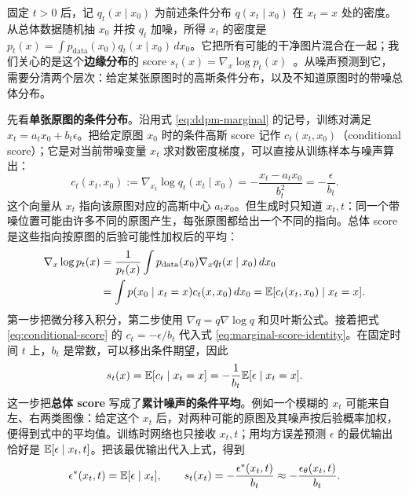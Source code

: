 固定 \(t>0\) 后，记 \(q_t(x\mid x_0)\) 为前述条件分布 \(q(x_t\mid x_0)\) 在 \(x_t=x\) 处的密度。从总体数据随机抽 \(x_0\) 并按 \(q_t\) 加噪，所得 \(x_t\) 的密度是 \(p_t(x)=\int p_{\mathrm{data}}(x_0)q_t(x\mid x_0)\,dx_0\)。它把所有可能的干净图片混合在一起；我们关心的是这个\textbf{边缘分布}的 score \(s_t(x)=\nabla_x\log p_t(x)\)~\cite{song2020ncsn,song2021score}。从噪声预测到它，需要分清两个层次：给定某张原图时的高斯条件分布，以及不知道原图时的带噪总体分布。

先看\textbf{单张原图的条件分布}。沿用式 \eqref{eq:ddpm-marginal} 的记号，训练对满足 \(x_t=a_tx_0+b_t\epsilon\)。把给定原图 \(x_0\) 时的条件高斯 score 记作 \(c_t(x_t,x_0)\)（conditional score）；它是对当前带噪变量 \(x_t\) 求对数密度梯度，可以直接从训练样本与噪声算出：
\begin{equation}
 c_t(x_t,x_0):=\nabla_{x_t}\log q_t(x_t\mid x_0)
 =-\frac{x_t-a_tx_0}{b_t^2}=-\frac{\epsilon}{b_t}.
 \label{eq:conditional-score}
\end{equation}
这个向量从 \(x_t\) 指向该原图对应的高斯中心 \(a_tx_0\)。但生成时只知道 \(x_t,t\)：同一个带噪位置可能由许多不同的原图产生，每张原图都给出一个不同的指向。总体 score 是这些指向按原图的后验可能性加权后的平均：
\begin{align}
 \nabla_x\log p_t(x)
 &=\frac{1}{p_t(x)}\int p_{\mathrm{data}}(x_0)\nabla_xq_t(x\mid x_0)\,dx_0\\
 &=\int p(x_0\mid x_t=x)c_t(x,x_0)\,dx_0
 =\mathbb{E}[c_t(x_t,x_0)\mid x_t=x].
 \label{eq:marginal-score-identity}
\end{align}
第一步把微分移入积分，第二步使用 \(\nabla q=q\nabla\log q\) 和贝叶斯公式。接着把式 \eqref{eq:conditional-score} 的 \(c_t=-\epsilon/b_t\) 代入式 \eqref{eq:marginal-score-identity}。在固定时间 \(t\) 上，\(b_t\) 是常数，可以移出条件期望，因此
\begin{equation}
 s_t(x)=\mathbb{E}[c_t\mid x_t=x]
 =-\frac{1}{b_t}\mathbb{E}[\epsilon\mid x_t=x].
\end{equation}
这一步把\textbf{总体 score} 写成了\textbf{累计噪声的条件平均}。例如一个模糊的 \(x_t\) 可能来自左、右两类图像：给定这个 \(x_t\) 后，对两种可能的原图及其噪声按后验概率加权，便得到式中的平均值。训练时网络也只接收 \(x_t,t\)；用均方误差预测 \(\epsilon\) 的最优输出恰好是 \(\mathbb{E}[\epsilon\mid x_t,t]\)。把该最优输出代入上式，得到
\begin{equation}
 \epsilon^*(x_t,t)=\mathbb{E}[\epsilon\mid x_t],\qquad
 s_t(x_t)=-\frac{\epsilon^*(x_t,t)}{b_t}
 \approx-\frac{\epsilon_\theta(x_t,t)}{b_t}.
 \label{eq:noise-score}
\end{equation}

